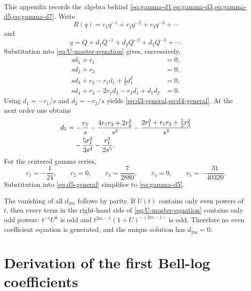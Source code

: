 \documentclass[11pt]{article}
\numberwithin{equation}{section}
\theoremstyle{mainthm}
\theoremstyle{defstyle}
\theoremstyle{remark}
\begin{document}
This appendix records the algebra behind \cref{eq:gamma-d1,eq:gamma-d3,eq:gamma-d5,eq:gamma-d7}.  Write
\begin{equation}\label{eq:app-R}
 R(q)=r_1q^{-1}+r_2q^{-2}+r_3q^{-3}+\cdots
\end{equation}
and
\begin{equation}\label{eq:app-delta}
 q=Q+d_1Q^{-1}+d_2Q^{-2}+d_3Q^{-3}+\cdots.
\end{equation}
Substitution into \cref{eq:U-master-equation} gives, successively,
\begin{align}
 s d_1+r_1&=0,\label{eq:app-match1}\\
 s d_2+r_2&=0,\label{eq:app-match2}\\
 s d_3+r_3-r_1d_1+\frac12d_1^2&=0,\label{eq:app-match3}\\
 s d_4+r_4-2r_1d_2-r_2d_1+d_1d_2&=0.
 \label{eq:app-match4}
\end{align}
Using \(d_1=-r_1/s\) and \(d_2=-r_2/s\) yields \cref{eq:d3-general,eq:d4-general}.  At the next order one obtains
\begin{align}
 d_5
 &=-\frac{r_5}{s}
 -\frac{4r_1r_3+2r_2^2}{s^2}
 -\frac{2r_1^3+r_1r_3+\tfrac12r_2^2}{s^3}\notag\\
 &\quad
 -\frac{5r_1^3}{3s^4}
 -\frac{r_1^3}{2s^5}.
 \label{eq:d5-general}
\end{align}
For the centered gamma series,
\[
 r_1=-\frac1{24},\qquad r_2=0,\qquad
 r_3=\frac7{2880},\qquad r_4=0,\qquad
 r_5=-\frac{31}{40320}.
\]
Substitution into \cref{eq:d5-general} simplifies to \cref{eq:gamma-d5}.

The vanishing of all \(d_{2m}\) follows by parity.  If \(U(t)\) contains only even powers of \(t\), then every term in the right-hand side of \cref{eq:U-master-equation} contains only odd powers: \(t^{-1}U^k\) is odd and \(t^{2m-1}(1+U)^{-(2m-1)}\) is odd.  Therefore no even coefficient equation is generated, and the unique solution has \(d_{2m}=0\).

\section{Derivation of the first Bell-log coefficients}\label{app:bell-log}
\end{document}
